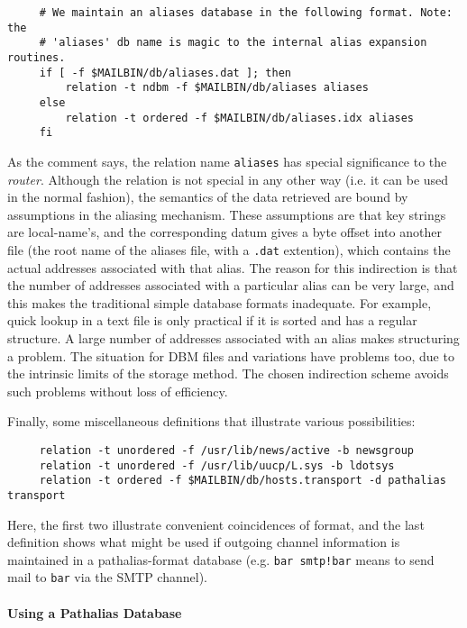 \begin{verbatim}
     # We maintain an aliases database in the following format. Note: the
     # 'aliases' db name is magic to the internal alias expansion routines.
     if [ -f $MAILBIN/db/aliases.dat ]; then
         relation -t ndbm -f $MAILBIN/db/aliases aliases
     else
         relation -t ordered -f $MAILBIN/db/aliases.idx aliases
     fi
\end{verbatim}


As the comment says, the relation name {\tt aliases} has special significance
to the {\em router\/}.  Although the relation is not special in any other way (i.e.
it can be used in the normal fashion), the semantics of the data retrieved
are bound by assumptions in the aliasing mechanism.  These assumptions are
that key strings are local-name's, and the corresponding datum gives a byte
offset into another file (the root name of the aliases file, with a {\tt .dat}
extention), which contains the actual addresses associated with that alias.
The reason for this indirection is that the number of addresses associated
with a particular alias can be very large, and this makes the traditional
simple database formats inadequate.  For example, quick lookup in a text
file is only practical if it is sorted and has a regular structure.  A
large number of addresses associated with an alias makes structuring a
problem.  The situation for DBM files and variations have problems too, due
to the intrinsic limits of the storage method.  The chosen indirection
scheme avoids such problems without loss of efficiency.

Finally, some miscellaneous definitions that illustrate various
possibilities:

\begin{verbatim}
     relation -t unordered -f /usr/lib/news/active -b newsgroup
     relation -t unordered -f /usr/lib/uucp/L.sys -b ldotsys
     relation -t ordered -f $MAILBIN/db/hosts.transport -d pathalias transport
\end{verbatim}


Here, the first two illustrate convenient coincidences of format, and the
last definition shows what might be used if outgoing channel information is
maintained in a pathalias-format database (e.g. {\tt bar smtp!bar} means to
send mail to {\tt bar} via the SMTP channel).






\paragraph{Using a Pathalias Database}





